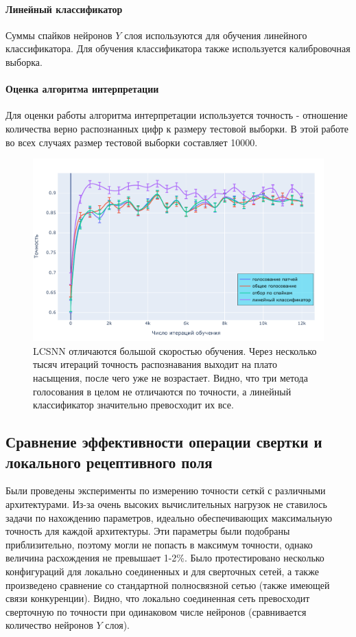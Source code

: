 \documentclass[a4paper]{article}
\begin{document}
\paragraph{Линейный классификатор}
Суммы спайков нейронов $Y$ слоя используются для обучения линейного классификатора. Для обучения классификатора также используется калибровочная выборка.

\paragraph{Оценка алгоритма интерпретации}
Для оценки работы алгоритма интерпретации используется точность - отношение количества верно распознанных цифр к размеру тестовой выборки. В этой работе во всех случаях размер тестовой выборки составляет 10000. 

\begin{figure}
\centering
 \includegraphics[width=.45\textwidth,keepaspectratio=true]{LCSNN_learning_rate_ru.pdf}
 \caption{LCSNN отличаются большой скоростью обучения. Через несколько тысяч итераций точность распознавания выходит на плато насыщения, после чего уже не возрастает. Видно, что три метода голосования в целом не отличаются по точности, а линейный классификатор значительно превосходит их все.}
\end{figure}


\subsection{Сравнение эффективности операции свертки и локального рецептивного поля}
Были проведены эксперименты по измерению точности сеткй с различными архитектурами. Из-за очень высоких вычислительных нагрузок не ставилось задачи по нахождению параметров, идеально обеспечивающих максимальную точность для каждой архитектуры. Эти параметры были подобраны приблизительно, поэтому могли не попасть в максимум точности, однако величина расхождения не превышает 1-2\%. Было протестировано несколько конфигураций для локально соединенных и для сверточных сетей, а также произведено сравнение со стандартной полносвязной сетью (также имеющей связи конкуренции). Видно, что локально соединенная сеть превосходит сверточную по точности при одинаковом числе нейронов (сравнивается количество нейронов $Y$ слоя). \\
\\
\\
\end{document}
